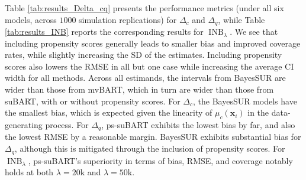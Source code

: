 \documentclass[aoas,preprint]{imsart}
\theoremstyle{plain}
\theoremstyle{definition}
\theoremstyle{remark}
\begin{document}
Table \ref{tab:results_Delta_cq} presents the performance metrics (under all six models, across $1000$ simulation replications) for $\Delta_c$ and $\Delta_q$, while Table \ref{tab:results_INB} reports the corresponding results for $\operatorname{INB}_\lambda$. We see that including propensity scores generally leads to smaller bias and improved coverage rates, while slightly increasing the SD of the estimates. Including propensity scores also lowers the RMSE in all but one case while increasing the average CI width for all methods. Across all estimands, the intervals from BayesSUR are wider than those from mvBART, which in turn are wider than those from suBART, with or without propensity scores. For $\Delta_c$, the BayesSUR models have the smallest bias, which is expected given the linearity of $\mu_c(\mathbf{x}_i)$ in the data-generating process. For $\Delta_q$, ps-suBART exhibits the lowest bias by far, and also the lowest RMSE by a reasonable margin. BayesSUR exhibits substantial bias for $\Delta_q$, although this is mitigated through the inclusion of propensity scores. For $\operatorname{INB}_\lambda$, ps-suBART's superiority in terms of bias, RMSE, and coverage notably holds at both $\lambda=20\mathrm{k}$ and $\lambda=50\mathrm{k}$.
\end{document}
